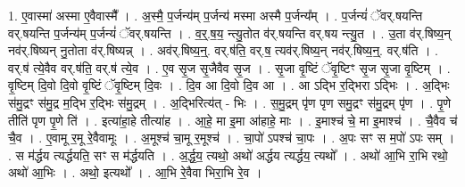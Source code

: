 \documentclass[17pt]{extarticle}
\begin{document}
1. ए॒वास्मा॑ अस्मा ए॒वैवास्मै᳚ । . अ॒स्मै॒ प॒र्जन्य॑म् प॒र्जन्य॑ मस्मा अस्मै प॒र्जन्य᳚म् । . प॒र्जन्यं॑ ॅवर्.षयन्ति वर्.षयन्ति प॒र्जन्य॑म् प॒र्जन्यं॑ ॅवर्.षयन्ति । . व॒र्॒.ष॒य॒ न्त्यु॒तोत व॑र्.षयन्ति वर्.षय न्त्यु॒त । . उ॒ता व॑र्.षिष्य॒न् नव॑र्.षिष्यन् नु॒तोता व॑र्.षिष्यन्न् । . अव॑र्.षिष्य॒न्॒. वर्.ष॑ति॒ वर्.ष॒ त्यव॑र्.षिष्य॒न् नव॑र्.षिष्य॒न्॒. वर्.ष॑ति । . वर्.ष॑ त्ये॒वैव वर्.ष॑ति॒ वर्.ष॑ त्ये॒व । . ए॒व सृ॒ज सृ॒जैवैव सृ॒ज । . सृ॒जा वृ॒ष्टिं ॅवृ॒ष्टिꣳ सृ॒ज सृ॒जा वृ॒ष्टिम् । . वृ॒ष्टिम् दि॒वो दि॒वो वृ॒ष्टिं ॅवृ॒ष्टिम् दि॒वः । . दि॒व आ दि॒वो दि॒व आ । . आ ऽद्भि र॒द्भिरा ऽद्भिः । . अ॒द्भिः स॑मु॒द्रꣳ स॑मु॒द्र म॒द्भि र॒द्भिः स॑मु॒द्रम् । . अ॒द्भिरित्य॑त् - भिः । . स॒मु॒द्रम् पृ॑ण पृण समु॒द्रꣳ स॑मु॒द्रम् पृ॑ण । . पृ॒णे तीति॑ पृण पृ॒णे ति॑ । . इत्या॑हा॒हे तीत्या॑ह । . आ॒हे॒ मा इ॒मा आ॑हाहे॒ माः । . इ॒माश्च॑ चे॒ मा इ॒माश्च॑ । . चै॒वैव च॑ चै॒व । . ए॒वामू र॒मू रे॒वैवामूः । . अ॒मूश्च॑ चा॒मू र॒मूश्च॑ । . चा॒पो॑ ऽपश्च॑ चा॒पः । . अ॒पः सꣳ स म॒पो॑ ऽपः सम् । . स म॑र्द्धय त्यर्द्धयति॒ सꣳ स म॑र्द्धयति । . अ॒र्द्ध॒य॒ त्यथो॒ अथो॑ अर्द्धय त्यर्द्धय॒ त्यथो᳚ । . अथो॑ आ॒भि रा॒भि रथो॒ अथो॑ आ॒भिः । . अथो॒ इत्यथो᳚ । . आ॒भि रे॒वैवा भिरा॒भि रे॒व । \newline
\end{document}
